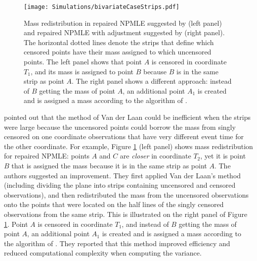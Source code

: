 \documentclass[]{article}
\begin{document}
\begin{figure}[!h]
\caption[Mass redistribution in repaired NPMLE suggested by \cite{van1996efficient} (left panel) and repaired NPMLE with adjustment suggested by \cite{moodie2005adjustment} (right panel).]{Mass redistribution in repaired NPMLE suggested by \cite{van1996efficient} (left panel) and repaired NPMLE with adjustment suggested by \cite{moodie2005adjustment} (right panel). The horizontal dotted lines denote the strips that define which censored points have their mass assigned to which uncensored points. The left panel shows that point $A$ is censored in coordinate $T_1$, and its mass is assigned to point $B$ because $B$ is in the same strip as point $A$. The right panel shows a different approach: instead of $B$ getting the mass of point $A$, an additional point $A_1$ is created and is assigned a mass according to the algorithm of \cite{moodie2005adjustment}.}
\texttt{[image: Simulations/bivariateCaseStrips.pdf]}
\label{fig:bcMoodie}
\end{figure}

\cite{moodie2005adjustment} pointed out that the method of Van der Laan could be inefficient when the strips were large because the uncensored points could borrow the mass from singly censored on one coordinate observations that have very different event time for the other coordinate. For example, Figure \ref{fig:bcMoodie} (left panel) shows mass redistribution for repaired NPMLE: points $A$ and $C$ are \emph{closer} in coordinate $T_2$, yet it is point $B$ that is assigned the mass because it is in the same strip as point $A$. The authors suggested an improvement. They first applied Van der Laan's method (including dividing the plane into strips containing uncensored and censored observations), and then redistributed the mass from the uncensored observations onto the points that were located on the half lines of the singly censored observations from the same strip. This is illustrated on the right panel of Figure \ref{fig:bcMoodie}. Point $A$ is censored in coordinate $T_1$, and instead of $B$ getting the mass of point $A$, an additional point $A_1$ is created and is assigned a mass according to the algorithm of \cite{moodie2005adjustment}. They reported that this method improved efficiency and reduced computational complexity when computing the variance.

\end{document}
